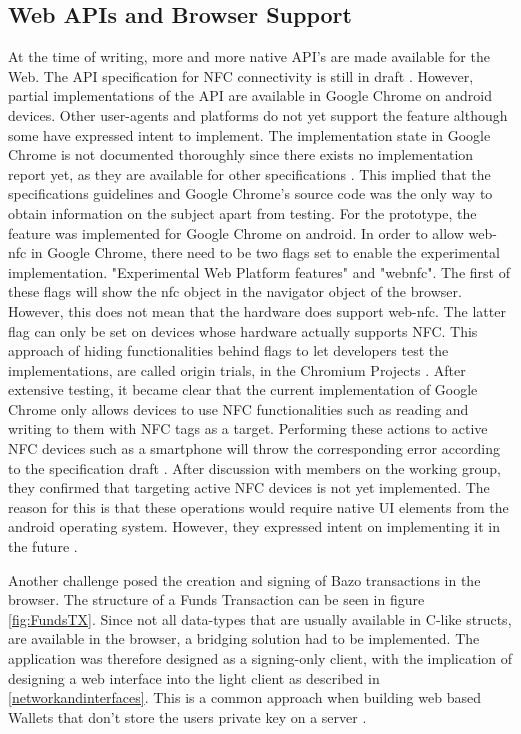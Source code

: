 \subsection{Web APIs and Browser Support}\label{browsersupport}
At the time of writing, more and more native API's are made available for the Web.
The API specification for NFC connectivity is still in draft \cite{webnfc}. However, partial implementations of the API are available in Google Chrome on android devices. Other user-agents and platforms do not yet support the feature although some have expressed intent to implement. The implementation state in Google Chrome is not documented thoroughly since there exists no implementation report yet, as they are available for other specifications \cite{localstoragetest}\cite{webnfc}. This implied that the specifications guidelines and Google Chrome's source code was the only way to obtain information on the subject apart from testing.
For the prototype, the feature was implemented for Google Chrome on android.
In order to allow web-nfc in Google Chrome, there need to be two flags set to enable the experimental implementation.
"Experimental Web Platform features" and "webnfc". The first of these flags will show the nfc object in the navigator object of the browser. However, this does not mean that the hardware does support web-nfc. The latter flag can only be set on devices whose hardware actually supports NFC. This approach of hiding functionalities behind flags to let developers test the implementations, are called origin trials, in the Chromium Projects \cite{origintrials}.
After extensive testing, it became clear that the current implementation of Google Chrome only allows devices to use NFC functionalities such as reading and writing to them with NFC tags as a target. Performing these actions to active NFC devices such as a smartphone will throw the corresponding error according to the specification draft \cite{webnfc}. After discussion with members on the working group, they confirmed that targeting active NFC devices is not yet implemented. The reason for this is that these operations would require native UI elements from the android operating system. However, they expressed intent on implementing it in the future \cite{webnfcpeer}.

Another challenge posed the creation and signing of Bazo transactions in the browser. The structure of a Funds Transaction can be seen in figure \ref{fig:FundsTX}. Since not all data-types that are usually available in C-like structs, are available in the browser, a bridging solution had to be implemented. The application was therefore designed as a signing-only client, with the implication of designing a web interface into the light client as described in \ref{networkandinterfaces}. This is a common approach when building web based Wallets that don't store the users private key on a server \cite{bitcoinclients}\cite{masteringbitcoin}.

